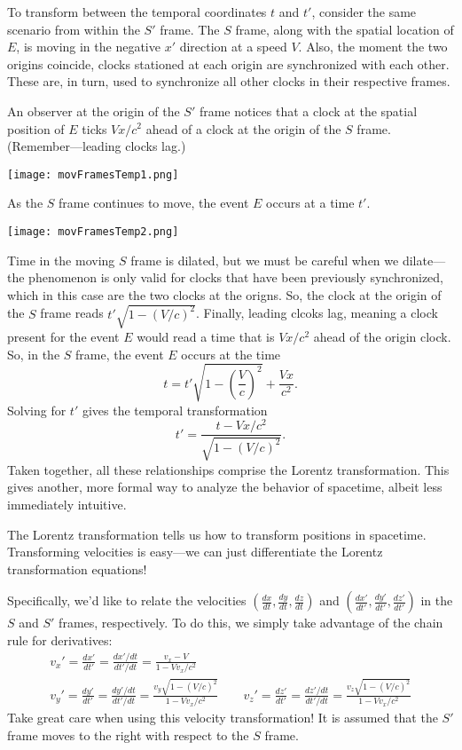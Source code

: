 \documentclass[../p023main.tex]{subfiles}
\begin{document}
To transform between the temporal coordinates $t$ and $t'$, consider the same scenario from within the $S'$ frame.
The $S$ frame, along with the spatial location of $E$, is moving in the negative $x'$ direction at a speed $V$.
Also, the moment the two origins coincide, clocks stationed at each origin are synchronized with each other.
These are, in turn, used to synchronize all other clocks in their respective frames.

An observer at the origin of the $S'$ frame notices that a clock at the spatial position of $E$ ticks $Vx / c^2$ ahead of a clock at the origin of the $S$ frame.
(Remember---leading clocks lag.)
\begin{center}
    \texttt{[image: movFramesTemp1.png]}
\end{center}
As the $S$ frame continues to move, the event $E$ occurs at a time $t'$.
\begin{center}
    \texttt{[image: movFramesTemp2.png]}
\end{center}
Time in the moving $S$ frame is dilated, but we must be careful when we dilate---the phenomenon is only valid for clocks that have been previously synchronized, which in this case are the two clocks at the origns.
So, the clock at the origin of the $S$ frame reads $t' \sqrt{1 - \left( V / c \right)^2}$.
Finally, leading clcoks lag, meaning a clock present for the event $E$ would read a time that is $Vx / c^2$ ahead of the origin clock.
So, in the $S$ frame, the event $E$ occurs at the time
\[ t = t' \sqrt{1 - \left( \frac{V}{c} \right)^2} + \frac{Vx}{c^2}. \]
Solving for $t'$ gives the temporal transformation
\[ t' = \frac{t - Vx / c^2}{\sqrt{1 - \left( V / c \right)^2}}. \]
Taken together, all these relationships comprise the Lorentz transformation.
This gives another, more formal way to analyze the behavior of spacetime, albeit less immediately intuitive.

The Lorentz transformation tells us how to transform positions in spacetime.
Transforming velocities is easy---we can just differentiate the Lorentz transformation equations!

Specifically, we'd like to relate the velocities $\left( \frac{dx}{dt}, \frac{dy}{dt}, \frac{dz}{dt} \right)$ and $\left( \frac{dx'}{dt'}, \frac{dy'}{dt'}, \frac{dz'}{dt'} \right)$ in the $S$ and $S'$ frames, respectively.
To do this, we simply take advantage of the chain rule for derivatives:
\begin{gather*}
    v_x' = \frac{dx'}{dt'} = \frac{dx'/dt}{dt'/dt} = \frac{v_x - V}{1 - Vv_x / c^2} \\
    v_y' = \frac{dy'}{dt'} = \frac{dy'/dt}{dt'/dt} = \frac{v_y\sqrt{1 - \left( V / c \right)^2}}{1 - Vv_x / c^2} \qquad
    v_z' = \frac{dz'}{dt'} = \frac{dz'/dt}{dt'/dt} = \frac{v_z\sqrt{1 - \left( V / c \right)^2}}{1 - Vv_x / c^2}
\end{gather*}
Take great care when using this velocity transformation!
It is assumed that the $S'$ frame moves to the right with respect to the $S$ frame.
\end{document}
